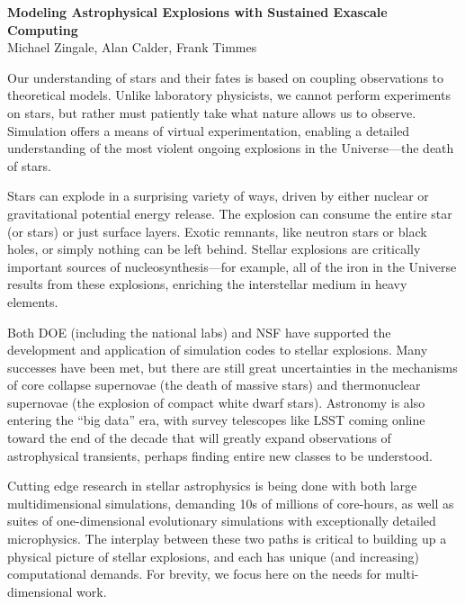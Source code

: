 \documentclass[11pt,twocolumn]{article}
\begin{document}
\begin{center}
{\sffamily \bfseries Modeling Astrophysical Explosions with Sustained Exascale Computing} \\
Michael Zingale\footnotemark[1], Alan Calder\footnotemark[1], Frank Timmes\footnotemark[2]
\end{center}
%

Our understanding of stars and their fates is based on coupling
observations to theoretical models.  Unlike laboratory physicists, we
cannot perform experiments on stars, but rather must
patiently take what nature allows us to observe.  Simulation offers a means
of virtual experimentation, enabling a detailed understanding of the
most violent ongoing explosions in the Universe---the death of stars.

Stars can explode in a surprising variety of ways, driven by either
nuclear or gravitational potential energy release.  The
explosion can consume the entire star (or stars) or just
surface layers.  Exotic remnants, like neutron stars or black holes, or
simply nothing can be left behind.  Stellar explosions are critically
important sources of nucleosynthesis---for example, all of the iron in
the Universe results from these explosions, enriching the interstellar
medium in heavy elements. 

Both DOE (including the national labs) and
NSF have supported the development and application of simulation codes
to stellar explosions.  Many successes have been met, but there are
still great uncertainties in the mechanisms of core collapse
supernovae (the death of massive stars) and thermonuclear supernovae
(the explosion of compact white dwarf stars).  Astronomy is also
entering the ``big data'' era, with survey telescopes like LSST coming
online toward the end of the decade that will greatly expand
observations of astrophysical transients, perhaps finding entire new
classes to be understood.

Cutting edge research in stellar astrophysics is being done with both
large multidimensional simulations, demanding 10s of millions of
core-hours, as well as suites of one-dimensional evolutionary
simulations with exceptionally detailed microphysics.  The interplay
between these two paths is critical to building up a physical picture
of stellar explosions, and each has unique (and increasing)
computational demands.  For brevity, we focus here on the needs for
multi-dimensional work.
\end{document}
